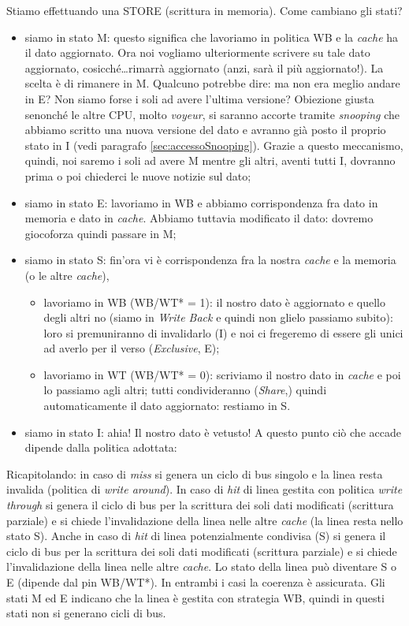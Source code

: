 Stiamo effettuando una STORE (scrittura in memoria). Come cambiano gli stati?
\begin{itemize}
\item siamo in stato M: questo significa che lavoriamo in politica WB e la \textit{cache} ha il dato aggiornato. Ora noi vogliamo ulteriormente scrivere su tale dato aggiornato, cosicché\ldots rimarrà aggiornato (anzi, sarà il più aggiornato!). La scelta è di rimanere in M. Qualcuno potrebbe dire: ma non era meglio andare in E? Non siamo forse i soli ad avere l'ultima versione? Obiezione giusta senonché le altre CPU, molto \textit{voyeur}, si saranno accorte tramite \textit{snooping} che abbiamo scritto una nuova versione del dato e avranno già posto il proprio stato in I (vedi paragrafo \ref{sec:accessoSnooping}). Grazie a questo meccanismo, quindi, noi saremo i soli ad avere M mentre gli altri, aventi tutti I, dovranno prima o poi chiederci le nuove notizie sul dato;
\item siamo in stato E: lavoriamo in WB e abbiamo corrispondenza fra dato in memoria e dato in\textit{ cache}. Abbiamo tuttavia modificato il dato: dovremo giocoforza quindi passare in M;
\item siamo in stato S: fin'ora vi è corrispondenza fra la nostra \textit{cache} e la memoria (o le altre \textit{cache}), 
\begin{itemize}
\item lavoriamo in WB (WB/WT* = 1): il nostro dato è aggiornato e quello degli altri no (siamo in \textit{Write Back} e quindi non glielo passiamo subito): loro si premuniranno di invalidarlo (I) e noi ci fregeremo di essere gli unici ad averlo per il verso (\textit{Exclusive}, E);
\item lavoriamo in WT (WB/WT* = 0): scriviamo il nostro dato in \textit{cache} e poi lo passiamo agli altri; tutti condivideranno (\textit{Share},) quindi automaticamente il dato aggiornato: restiamo in S.
\end{itemize}
\item siamo in stato I: ahia! Il nostro dato è vetusto! A questo punto ciò che accade dipende dalla politica adottata:
\end{itemize}

Ricapitolando: in caso di \textit{miss} si genera un ciclo di bus singolo e la linea resta invalida (politica di \textit{write around}). In caso di \textit{hit} di linea gestita con politica \textit{write through} si genera il ciclo di bus per la scrittura dei soli dati modificati (scrittura parziale) e si chiede l'invalidazione della linea nelle altre \textit{cache} (la linea resta nello stato S). Anche in caso di \textit{hit} di linea potenzialmente condivisa (S) si genera il ciclo di bus per la scrittura dei soli dati modificati (scrittura parziale) e si chiede l'invalidazione della linea nelle altre \textit{cache}. Lo stato della linea può diventare S o E (dipende dal pin WB/WT*). In entrambi i casi la coerenza è assicurata. Gli stati M ed E indicano che la linea è gestita con strategia WB, quindi in questi stati non si generano cicli di bus.

